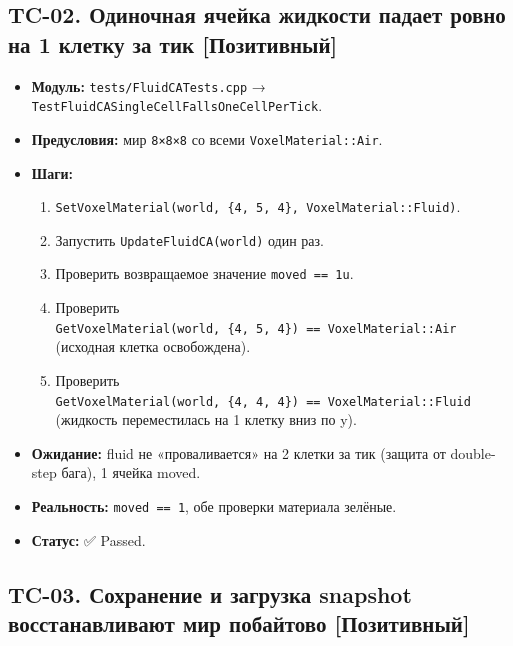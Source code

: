 \subsection{TC-02. Одиночная ячейка жидкости падает ровно на 1 клетку за тик {[}Позитивный{]}}\label{KT-2.2_Test_Report-tc-02-ux43eux434ux438ux43dux43eux447ux43dux430ux44f-ux44fux447ux435ux439ux43aux430-ux436ux438ux434ux43aux43eux441ux442ux438-ux43fux430ux434ux430ux435ux442-ux440ux43eux432ux43dux43e-ux43dux430-1-ux43aux43bux435ux442ux43aux443-ux437ux430-ux442ux438ux43a-ux43fux43eux437ux438ux442ux438ux432ux43dux44bux439}

\begin{itemize}
\tightlist
\item
  \textbf{Модуль:} \texttt{tests/FluidCATests.cpp} → \texttt{TestFluidCASingleCellFallsOneCellPerTick}.
\item
  \textbf{Предусловия:} мир \texttt{8×8×8} со всеми \texttt{VoxelMaterial::Air}.
\item
  \textbf{Шаги:}

  \begin{enumerate}
  \def\labelenumi{\arabic{enumi}.}
  \tightlist
  \item
    \texttt{SetVoxelMaterial(world,\ \{4,\ 5,\ 4\},\ VoxelMaterial::Fluid)}.
  \item
    Запустить \texttt{UpdateFluidCA(world)} один раз.
  \item
    Проверить возвращаемое значение \texttt{moved\ ==\ 1u}.
  \item
    Проверить \texttt{GetVoxelMaterial(world,\ \{4,\ 5,\ 4\})\ ==\ VoxelMaterial::Air} (исходная клетка освобождена).
  \item
    Проверить \texttt{GetVoxelMaterial(world,\ \{4,\ 4,\ 4\})\ ==\ VoxelMaterial::Fluid} (жидкость переместилась на 1 клетку вниз по y).
  \end{enumerate}
\item
  \textbf{Ожидание:} fluid не «проваливается» на 2 клетки за тик (защита от double-step бага), 1 ячейка moved.
\item
  \textbf{Реальность:} \texttt{moved\ ==\ 1}, обе проверки материала зелёные.
\item
  \textbf{Статус:} ✅ Passed.
\end{itemize}

\subsection{TC-03. Сохранение и загрузка snapshot восстанавливают мир побайтово {[}Позитивный{]}}\label{KT-2.2_Test_Report-tc-03-ux441ux43eux445ux440ux430ux43dux435ux43dux438ux435-ux438-ux437ux430ux433ux440ux443ux437ux43aux430-snapshot-ux432ux43eux441ux441ux442ux430ux43dux430ux432ux43bux438ux432ux430ux44eux442-ux43cux438ux440-ux43fux43eux431ux430ux439ux442ux43eux432ux43e-ux43fux43eux437ux438ux442ux438ux432ux43dux44bux439}

